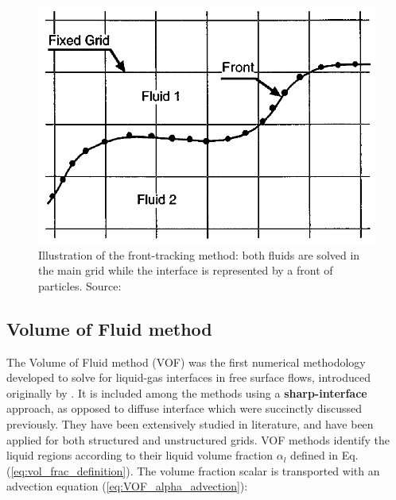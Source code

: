 \begin{figure}[h!]
	\centering
	\includegraphics[scale=0.5]{./part1_numerical_approaches/figures_ch2/front-tracking_triggvason}
	\caption[Illustration of the front-tracking method]{Illustration of the front-tracking method: both fluids are solved in the main grid while the interface is represented by a front of particles. Source: }
	\label{fig:front_tracking_tryggvason}
\end{figure}



\subsection{Volume of Fluid method}
\label{subsec:ch2_VOF}


The Volume of Fluid method (VOF) was the first numerical methodology developed to solve for liquid-gas interfaces in free surface flows, introduced originally by . It is included among the methods using a \textbf{sharp-interface} approach, as opposed to diffuse interface which were succinctly discussed previously. They have been extensively studied in literature, and have been applied for both structured  and unstructured  grids. VOF methods identify the liquid regions according to their liquid volume fraction $\alpha_l$ defined in Eq. (\ref{eq:vol_frac_definition}). The volume fraction scalar is transported with an advection equation (\ref{eq:VOF_alpha_advection}):

